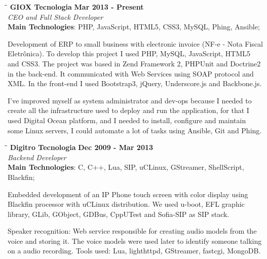 \documentclass[margin]{res}
\begin{document}
\begin{resume}
\vspace{-0.1in}
    \begin{tabbing}
    \hspace{2.3in}\= \hspace{1.7in}\= \kill
    \textbf{GIOX Tecnologia}    \>\>\textbf{Mar 2013 - Present}\\
    \textit{CEO and Full Stack Developer}\\
    \textbf{Main Technologies}: PHP, JavaScript, HTML5, CSS3, MySQL, Phing, Ansible;
    \end{tabbing}\vspace{-20pt}
    \vspace{2mm}
Development of ERP to small business with electronic invoice (NF-e - Nota Fiscal Eletrônica). To develop this project I used PHP, MySQL, JavaScript, HTML5 and CSS3. The project was based in Zend Framework 2, PHPUnit and Doctrine2 in the back-end. It communicated with Web Services using SOAP protocol and XML. In the front-end I used Bootstrap3, jQuery, Underscore.js and Backbone.js.

I've improved myself as system administrator and dev-ops because I needed to create all the infrastructure used to deploy and run the application, for that I used Digital Ocean platform, and I needed to install, configure and maintain some Linux servers, I could automate a lot of tasks using Ansible, Git and Phing.

\vspace{-0.1in}
    \begin{tabbing}
    \hspace{2.3in}\= \hspace{1.7in}\= \kill
    \textbf{Digitro Tecnologia}    \>\>\textbf{Dec 2009 - Mar 2013}\\
    \textit{Backend Developer}\\
    \textbf{Main Technologies}: C, C++, Lua, SIP, uCLinux, GStreamer, ShellScript, Blackfin;
    \end{tabbing}\vspace{-20pt}
    \vspace{2mm}
Embedded development of an IP Phone touch screen with color display using Blackfin processor with uCLinux distribution. We used u-boot, EFL graphic library, GLib, GObject, GDBus, CppUTest and Sofia-SIP as SIP stack.
    
Speaker recognition: Web service responsible for creating audio models from the voice and storing it. The voice models were used later to identify someone talking on a audio recording. Tools used: Lua, lighthttpd, GStreamer, fastcgi, MongoDB.


\end{resume}
\end{document}

